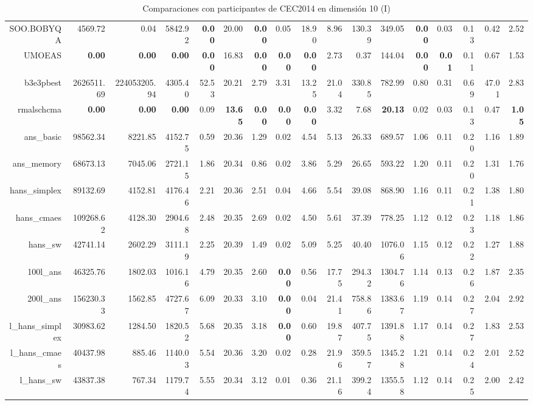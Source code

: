 \begin{table}[h!]
\begin{tabular}{rrrrrrrrrrrrrrrrr}
  SOO.BOBYQA & 4569.72 & 0.04 & 5842.92 & \textbf{0.00} & 20.00 & \textbf{0.00} & 0.05 & 18.90 & 8.96 & 130.39 & 349.05 & \textbf{0.00} & 0.03 & 0.13 & 0.42 & 2.52 \\ 
  UMOEAS & \textbf{0.00} & \textbf{0.00} & \textbf{0.00} & \textbf{0.00} & 16.83 & \textbf{0.00} & \textbf{0.00} & \textbf{0.00} & 2.73 & 0.37 & 144.04 & \textbf{0.00} & \textbf{0.01} & 0.11 & 0.67 & 1.53 \\ 
  b3e3pbest & 2626511.69 & 224053205.94 & 4305.40 & 52.53 & 20.21 & 2.79 & 3.31 & 13.25 & 21.04 & 330.85 & 782.99 & 0.80 & 0.31 & 0.69 & 47.01 & 2.83 \\ 
  rmalschcma & \textbf{0.00} & \textbf{0.00} & \textbf{0.00} & 0.09 & \textbf{13.65} & \textbf{0.00} & \textbf{0.00} & \textbf{0.00} & 3.32 & 7.68 & \textbf{20.13} & 0.02 & 0.03 & 0.13 & 0.47 & \textbf{1.05} \\ 
  ans\_basic & 98562.34 & 8221.85 & 4152.75 & 0.59 & 20.36 & 1.29 & 0.02 & 4.54 & 5.13 & 26.33 & 689.57 & 1.06 & 0.11 & 0.20 & 1.16 & 1.89 \\ 
  ans\_memory & 68673.13 & 7045.06 & 2721.15 & 1.86 & 20.34 & 0.86 & 0.02 & 3.86 & 5.29 & 26.65 & 593.22 & 1.20 & 0.11 & 0.20 & 1.31 & 1.76 \\ 
  hans\_simplex & 89132.69 & 4152.81 & 4176.46 & 2.21 & 20.36 & 2.51 & 0.04 & 4.66 & 5.54 & 39.08 & 868.90 & 1.16 & 0.11 & 0.21 & 1.38 & 1.80 \\ 
  hans\_cmaes & 109268.62 & 4128.30 & 2904.68 & 2.48 & 20.35 & 2.69 & 0.02 & 4.50 & 5.61 & 37.39 & 778.25 & 1.12 & 0.12 & 0.23 & 1.18 & 1.86 \\ 
  hans\_sw & 42741.14 & 2602.29 & 3111.19 & 2.25 & 20.39 & 1.49 & 0.02 & 5.09 & 5.25 & 40.40 & 1076.06 & 1.15 & 0.12 & 0.22 & 1.27 & 1.88 \\ 
  100l\_ans & 46325.76 & 1802.03 & 1016.16 & 4.79 & 20.35 & 2.60 & \textbf{0.00} & 0.56 & 17.75 & 294.32 & 1304.76 & 1.14 & 0.13 & 0.26 & 1.87 & 2.35 \\ 
  200l\_ans & 156230.33 & 1562.85 & 4727.67 & 6.09 & 20.33 & 3.10 & \textbf{0.00} & 0.04 & 21.41 & 758.86 & 1383.67 & 1.19 & 0.14 & 0.27 & 2.04 & 2.92 \\ 
  l\_hans\_simplex & 30983.62 & 1284.50 & 1820.52 & 5.68 & 20.35 & 3.18 & \textbf{0.00} & 0.60 & 19.87 & 407.75 & 1391.88 & 1.17 & 0.14 & 0.27 & 1.83 & 2.53 \\ 
  l\_hans\_cmaes & 40437.98 & 885.46 & 1140.03 & 5.54 & 20.36 & 3.20 & 0.02 & 0.28 & 21.96 & 359.57 & 1345.28 & 1.21 & 0.14 & 0.24 & 2.01 & 2.52 \\ 
  l\_hans\_sw & 43837.38 & 767.34 & 1179.74 & 5.55 & 20.34 & 3.12 & 0.01 & 0.36 & 21.16 & 399.24 & 1355.58 & 1.12 & 0.14 & 0.25 & 2.00 & 2.42 \\ 
   \hline
\end{tabular}
\endgroup
\caption{Comparaciones con participantes de CEC2014 en dimensión 10 (I)} 
\label{cec10a}
\end{table}
